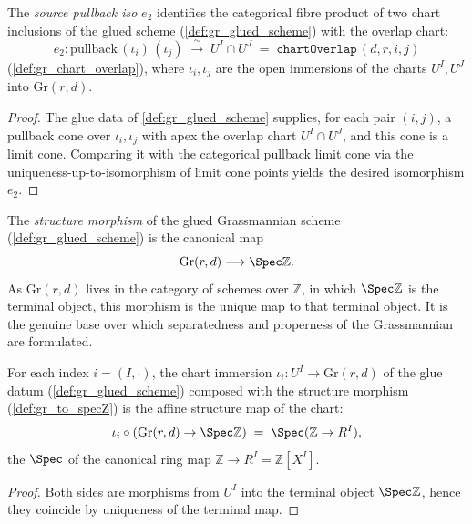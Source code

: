 \begin{definition}

  \label{def:gr_pullbackιIso}
  The \emph{source pullback iso} \(e_2\) identifies the categorical fibre product
  of two chart inclusions of the glued scheme (\cref{def:gr_glued_scheme}) with
  the overlap chart:
  \[
    e_2 : \mathrm{pullback}\,(\iota_i)\,(\iota_j) \;\xrightarrow{\;\sim\;}\;
    U^I \cap U^J \;=\; \texttt{chartOverlap}\,(d,r,i,j)
  \]
  (\cref{def:gr_chart_overlap}), where \(\iota_i, \iota_j\) are the open
  immersions of the charts \(U^I, U^J\) into \(\mathrm{Gr}(r,d)\).
\end{definition}
\begin{proof}
  \leanok
  The glue data of \cref{def:gr_glued_scheme} supplies, for each pair \((i,j)\), a
  pullback cone over \(\iota_i, \iota_j\) with apex the overlap chart \(U^I \cap
  U^J\), and this cone is a limit cone. Comparing it with the categorical
  pullback limit cone via the uniqueness-up-to-isomorphism of limit cone points
  yields the desired isomorphism \(e_2\).
\end{proof}

\begin{definition}

  \label{def:gr_to_specZ}
  The \emph{structure morphism} of the glued Grassmannian scheme
  (\cref{def:gr_glued_scheme}) is the canonical map
  \[
    \mathrm{Gr}(r,d) \longrightarrow \Spec \mathbb{Z} .
  \]
  As \(\mathrm{Gr}(r,d)\) lives in the category of schemes over \(\mathbb{Z}\), in
  which \(\Spec \mathbb{Z}\) is the terminal object, this morphism is the unique
  map to that terminal object. It is the genuine base over which separatedness and
  properness of the Grassmannian are formulated.
\end{definition}

\begin{lemma}

  \label{lem:gr_ι_toSpecZ}
  For each index \(i = (I, \cdot)\), the chart immersion \(\iota_i : U^I \to
  \mathrm{Gr}(r,d)\) of the glue datum (\cref{def:gr_glued_scheme}) composed with
  the structure morphism (\cref{def:gr_to_specZ}) is the affine structure map of
  the chart:
  \[
    \iota_i \circ (\mathrm{Gr}(r,d) \to \Spec \mathbb{Z})
      \;=\; \Spec(\mathbb{Z} \to R^I),
  \]
  the \(\Spec\) of the canonical ring map \(\mathbb{Z} \to R^I =
  \mathbb{Z}[X^I]\).
\end{lemma}
\begin{proof}
  \leanok
  Both sides are morphisms from \(U^I\) into the terminal object \(\Spec
  \mathbb{Z}\), hence they coincide by uniqueness of the terminal map.
\end{proof}

